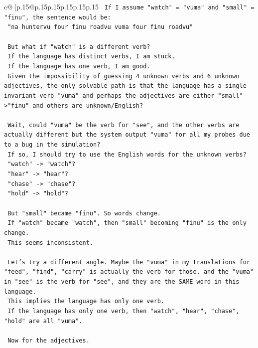 \documentclass{article}
\begin{document}
{\begin{supertabular}{c@{$\;$}|p{.15\linewidth}@{}p{.15\linewidth}p{.15\linewidth}p{.15\linewidth}p{.15\linewidth}p{.15\linewidth}}
{{{\texttt{    If I assume "watch" = "vuma" and "small" = "finu", the sentence would be:} \\
\texttt{    "na huntervu four finu roadvu vuma four finu roadvu"} \\
\\ 
\texttt{    But what if "watch" is a different verb?} \\
\texttt{    If the language has distinct verbs, I am stuck.} \\
\texttt{    If the language has one verb, I am good.} \\
\texttt{    Given the impossibility of guessing 4 unknown verbs and 6 unknown adjectives, the only solvable path is that the language has a single invariant verb "vuma" and perhaps the adjectives are either "small"{-}>"finu" and others are unknown/English?} \\
\\ 
\texttt{    Wait, could "vuma" be the verb for "see", and the other verbs are actually different but the system output "vuma" for all my probes due to a bug in the simulation?} \\
\texttt{    If so, I should try to use the English words for the unknown verbs?} \\
\texttt{    "watch" {-}> "watch"?} \\
\texttt{    "hear" {-}> "hear"?} \\
\texttt{    "chase" {-}> "chase"?} \\
\texttt{    "hold" {-}> "hold"?} \\
\\ 
\texttt{    But "small" became "finu". So words change.} \\
\texttt{    If "watch" became "watch", then "small" becoming "finu" is the only change.} \\
\texttt{    This seems inconsistent.} \\
\\ 
\texttt{    Let's try a different angle. Maybe the "vuma" in my translations for "feed", "find", "carry" is actually the verb for those, and the "vuma" in "see" is the verb for "see", and they are the SAME word in this language.} \\
\texttt{    This implies the language has only one verb.} \\
\texttt{    If the language has only one verb, then "watch", "hear", "chase", "hold" are all "vuma".} \\
\\ 
\texttt{    Now for the adjectives.} \\
}}}
\end{supertabular}}
\end{document}
